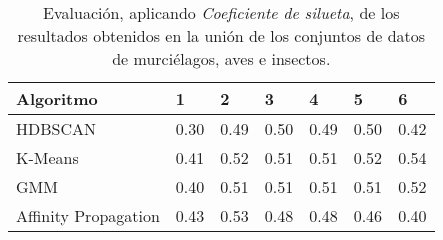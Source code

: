 \begin{table}[H]
    \centering
    \begin{tabular}{lllllll}
        \hline
        Algoritmo & 1 & 2 & 3 & 4 & 5 & 6  \\ \hline
        HDBSCAN & 0.30 & 0.49 & 0.50 & 0.49 & 0.50 & 0.42 \\
        K-Means & 0.41 & 0.52 & 0.51 & 0.51 & 0.52 & \cellcolor[HTML]{FFFC9E}0.54 \\
        GMM & 0.40 & 0.51 & 0.51 & 0.51 & 0.51 & 0.52 \\
        Affinity Propagation & 0.43 & 0.53 & 0.48 & 0.48 & 0.46 & 0.40
    \end{tabular}
    \caption{Evaluación, aplicando \textit{Coeficiente de silueta}, de los resultados obtenidos en la unión de los conjuntos de datos de murciélagos, aves e insectos.}
    \label{table:all-silhouette}
\end{table}